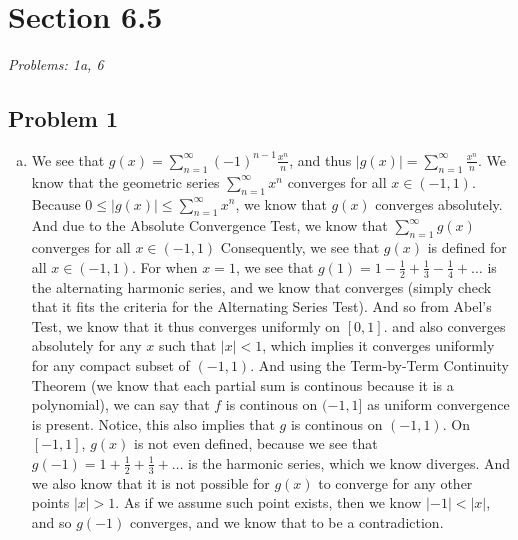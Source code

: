 \documentclass[12pt]{article}
\begin{document}

\section*{Section 6.5}
\textit{Problems: 1a, 6}

\subsection*{Problem 1}
\begin{enumerate}[a).]
    \item {
        We see that $g(x) = \sum_{n = 1}^{\infty}(-1)^{n-1}\frac{x^n}{n}$, and thus $|g(x)| = \sum_{n=1}^{\infty}\frac{x^n}{n}$. 
        We know that the geometric series $\sum_{n=1}^{\infty}x^n$ converges for all $x \in (-1,1)$. 
        Because $0 \le |g(x)| \le \sum_{n=1}^{\infty}x^n$, we know that $g(x)$ converges absolutely.
        And due to the Absolute Convergence Test, we know that $\sum_{n=1}^{\infty}g(x)$ converges for all $x \in (-1,1)$
        Consequently, we see that $g(x)$ is defined for all $x \in (-1,1)$. 
        For when $x = 1$, we see that $g(1) = 1 - \frac{1}{2} + \frac{1}{3} - \frac{1}{4} + \dots$ is the alternating harmonic series, and we know that converges (simply check that it fits the criteria for the Alternating Series Test). 
        And so from Abel's Test, we know that it thus converges uniformly on $[0,1]$. and also converges absolutely for any $x$ such that $|x|<1$, which implies it converges uniformly for any compact subset of $(-1,1)$. 
        And using the Term-by-Term Continuity Theorem (we know that each partial sum is continous because it is a polynomial), we can say that $f$ is continous on $(-1,1]$ as uniform convergence is present. 
        Notice, this also implies that $g$ is continous on $(-1,1)$. 
        On $[-1,1]$, $g(x)$ is not even defined, because we see that $g(-1) = 1 + \frac{1}{2} + \frac{1}{3} + \dots$ is the harmonic series, which we know diverges. 
        And we also know that it is not possible for $g(x)$ to converge for any other points $|x|>1$. 
        As if we assume such point exists, then we know $|-1| < |x|$, and so $g(-1)$ converges, and we know that to be a contradiction.
    }
\end{enumerate}
\end{document}
